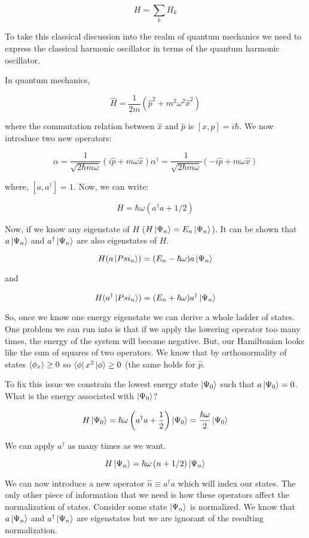\documentclass{article}
\begin{document}
\[ 
    H = \sum_k H_k 
\]

To take this classical discussion into the realm of quantum mechanics we need to
express the classical harmonic oscillator in terms of the quantum harmonic
oscillator.

In quantum mechanics,

\[ 
    \hat{H} = \frac{1}{2m} \left( \hat{p}^2 + m^2\omega^2 \hat{x}^2 \right)
\]

where the commutation relation between $\hat{x}$ and $\hat{p}$ is $[x,p] =
i\hbar$. We now introduce two new operators:

\[
    \alpha = \frac{1}{\sqrt{2\hbar m \omega}} \left( i \hat{p} + m \omega
    \hat{x} \right)
    \alpha^\dagger = \frac{1}{\sqrt{2 \hbar m \omega}} \left( -i \hat{p} + m
    \omega \hat{x} \right)
\]

where, $[a,a^\dagger] = 1$. Now, we can write:

\[ 
    H = \hbar \omega \left( a^\dagger a + 1/2 \right) 
\]

Now, if we know any eigenstate of $H$ ($H\ket{\Psi_n} = E_n \ket{\Psi_n}$). It
can be shown that $a\ket{\Psi_n}$ and $a^\dagger \ket{\Psi_n}$ are also
eigenstates of $H$.

\[ 
    H(a\ket{Psi_n}) = (E_n - \hbar \omega) a \ket{\Psi_n} 
\]

and

\[ 
    H(a^\dagger \ket{Psi_n}) = (E_n + \hbar \omega) a^\dagger \ket{\Psi_n} 
\]

So, once we know one energy eigenstate we can derive a whole ladder of states.
One problem we can run into is that if we apply the lowering operator too many
times, the energy of the system will become negative. But, our Hamiltonian looks
like the sum of squares of two operators. We know that by orthonormality of
states $\braket{\phi_x} \ge 0$ so $\bra{\phi} x^2 \ket{\phi} \ge 0$ (the same
holds for $\hat{p}$.

To fix this issue we constrain the lowest energy state $\ket{\Psi_0}$ such that
$a \ket{\Psi_0} = 0$. What is the energy associated with $\ket{\Psi_0}$?

\[ 
    H \ket{\Psi_0} = \hbar \omega \left( a^\dagger a + \frac{1}{2} \right)
    \ket{\Psi_0} = \frac{\hbar \omega}{2} \ket{\Psi_0} 
\]

We can apply $a^\dagger$ as many times as we want.

\[ 
    H \ket{\Psi_n} = \hbar \omega \left( n + 1/2 \right) \ket{\Psi_n}
\]

We can now introduce a new operator $\hat{n} \equiv a^\dagger a$ which will
index our states. The only other piece of information that we need is how these
operators affect the normalization of states. Consider some state $\ket{\Psi_n}$
is normalized. We know that $a \ket{\Psi_n}$ and $a^\dagger \ket{\Psi_n}$ are
eigenstates but we are ignorant of the resulting normalization.
\end{document}

